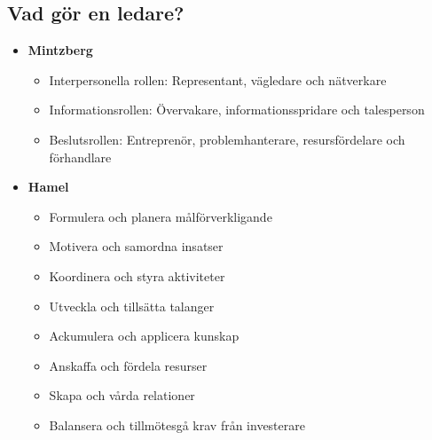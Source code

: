 \documentclass{article}
\begin{document}
\subsection{Vad gör en ledare?}
\begin{itemize}
    \item \textbf{Mintzberg}
    \begin{itemize}
        \item Interpersonella rollen: \newline
        Representant, vägledare och nätverkare
        \item Informationsrollen: \newline
        Övervakare, informationsspridare och talesperson
        \item Beslutsrollen: \newline
        Entreprenör, problemhanterare, resursfördelare och förhandlare
    \end{itemize}
    \item \textbf{Hamel}
    \begin{itemize}
        \item Formulera och planera målförverkligande
        \item Motivera och samordna insatser
        \item Koordinera och styra aktiviteter
        \item Utveckla och tillsätta talanger
        \item Ackumulera och applicera kunskap
        \item Anskaffa och fördela resurser
        \item Skapa och vårda relationer
        \item Balansera och tillmötesgå krav från investerare
    \end{itemize}
\end{itemize}
\end{document}
